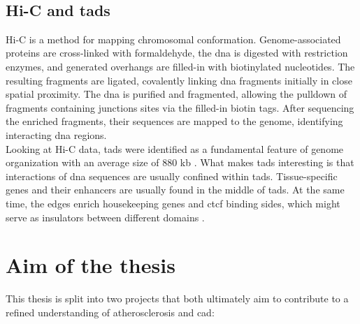     \subsection{Hi-C and \acsp{tad}}
    Hi-C is a method for mapping chromosomal conformation. Genome-associated proteins are cross-linked with formaldehyde, the \ac{dna} is digested with restriction enzymes, and generated overhangs are filled-in with biotinylated nucleotides. The resulting fragments are ligated, covalently linking \ac{dna} fragments initially in close spatial proximity. The \ac{dna} is purified and fragmented, allowing the pulldown of fragments containing junctions sites via the filled-in biotin tags. After sequencing the enriched fragments, their sequences are mapped to the genome, identifying interacting \ac{dna} regions. \cite{lieberman-aidenComprehensiveMappingLongRange2009, witDecade3CTechnologies2012}\\
    Looking at Hi-C data, \acp{tad} were identified as a fundamental feature of genome organization with an average size of 880 kb \cite{dixonTopologicalDomainsMammalian2012, wang3DGenomeBrowser2018}. What makes \acp{tad} interesting is that interactions of \ac{dna} sequences are usually confined within \acp{tad}. Tissue-specific genes and their enhancers are usually found in the middle of \acp{tad}. At the same time, the edges enrich housekeeping genes and \ac{ctcf} binding sides, which might serve as insulators between different domains \cite{pomboThreedimensionalGenomeArchitecture2015}.


\section{Aim of the thesis}
\label{sec:Aim}
This thesis is split into two projects that both ultimately aim to contribute to a refined understanding of atherosclerosis and \ac{cad}:

